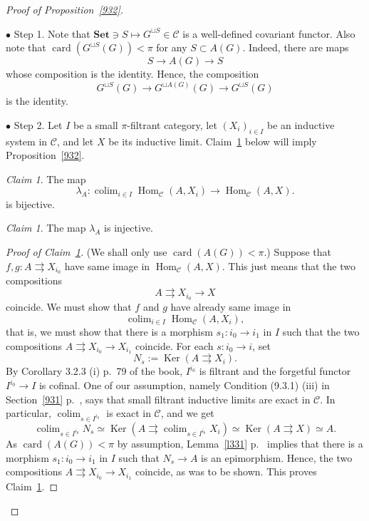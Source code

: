 \documentclass[12pt]{article}
\theoremstyle{remark}
\newtheorem{claim}[thm]{Claim}
\theoremstyle{definition}
\newcommand{\bu}{\bullet}
\newcommand{\nn}{\noindent}
\newcommand{\C}{\mathcal C}
\newcommand{\Set}{\mathbf{Set}}
\newcommand{\parar}{\rightrightarrows}
\DeclareMathOperator*{\colim}{colim}
\DeclareMathOperator{\card}{card}
\DeclareMathOperator{\Hom}{Hom}
\DeclareMathOperator{\Ker}{Ker}
\begin{document}
\begin{proof}[Proof of Proposition~\ref{932}]${}$ 

\nn$\bu$ Step 1. Note that $\Set\ni S\mapsto G^{\sqcup S}\in\C$ is a well-defined covariant functor. Also note that $\card(G^{\sqcup S}(G))<\pi$ for any $S\subset A(G)$. Indeed, there are maps 
$$
S\to A(G)\to S
$$ 
whose composition is the identity. Hence, the composition 
$$
G^{\sqcup S}(G)\to G^{\sqcup A(G)}(G)\to G^{\sqcup S}(G)
$$ 
is the identity.

\nn$\bu$ Step 2. Let $I$ be a small $\pi$-filtrant category, let $(X_i)_{i\in I}$ be an inductive system in $\C$, and let $X$ be its inductive limit. Claim~\ref{lbij} below will imply Proposition~\ref{932}. 

\begin{claim}\label{lbij} 
The map 
$$
\lambda_A:\colim_{i\in I}\Hom_\C(A,X_i)\to\Hom_\C(A,X).
$$ 
is bijective. 
\end{claim}

\begin{claim}\label{linj} 
The map $\lambda_A$ is injective. 
\end{claim} 

\begin{proof}[Proof of Claim~\ref{linj}] 
(We shall only use $\card(A(G))<\pi$.) Suppose that $f,g:A\parar X_{i_0}$ have same image in $\Hom_\C(A,X)$. This just means that the two compositions 
$$
A\parar X_{i_0}\to X
$$ 
coincide. We must show that $f$ and $g$ have already same image in 
$$
\colim_{i\in I}\Hom_\C(A,X_i),
$$ 
that is, we must show that there is a morphism $s_1:i_0\to i_1$ in $I$ such that the two compositions $A\parar X_{i_0}\to X_{i_1}$ coincide. For each $s:i_0\to i$, set 
$$
N_s:=\Ker(A\parar X_i).
$$ 
By Corollary 3.2.3 (i) p.~79 of the book, $I^{i_0}$ is filtrant and the forgetful functor $I^{i_0}\to I$ is cofinal. One of our assumption, namely Condition (9.3.1) (iii) in Section~\ref{931} p.~\pageref{931}, says that small filtrant inductive limits are exact in $\C$. In particular, $\colim_{s\in I^{i_0}}$ is exact in $\C$, and we get  
$$
\colim_{s\in I^{i_0}}N_s\simeq\Ker\left(A\parar\colim_{s\in I^{i_0}}X_i\right)\simeq\Ker(A\parar X)\simeq A. 
$$ 
As $\card(A(G))<\pi$ by assumption, Lemma~\ref{l331} p.~\pageref{l331} implies that there is a morphism $s_1:i_0\to i_1$ in $I$ such that $N_s\to A$ is an epimorphism. Hence, the two compositions $A\parar X_{i_0}\to X_{i_1}$ coincide, as was to be shown. This proves Claim~\ref{linj}. 
\end{proof} 


\end{proof}
\end{document}
